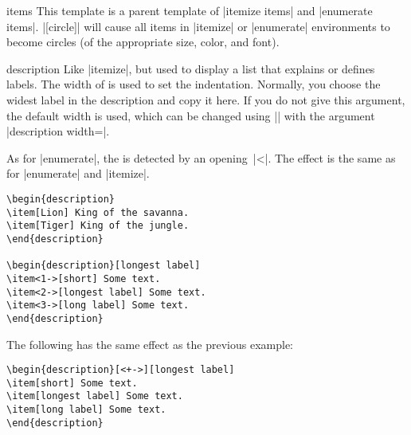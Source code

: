\begin{element}{items}\semiyes\no\no
  This template is a parent template of |itemize items| and
  |enumerate items|.
  \example |[circle]| will cause all items in
  |itemize| or |enumerate| environments to become circles (of the
  appropriate size, color, and font).
\end{element}


\label{section-descriptions}

\begin{environment}{{description}}
  Like |itemize|, but used to display a list that explains or defines
  labels. The width of  is used to set the
  indentation. Normally, you choose the widest label in the
  description and copy it here. If you do not give this argument, the
  default width is used, which can be changed using |\setbeamersize|
  with the argument |description width=|.

  As for |enumerate|, the  is
  detected by an opening~|<|. The effect is the same as for
  |enumerate| and |itemize|.
  \example
\begin{verbatim}
\begin{description}
\item[Lion] King of the savanna.
\item[Tiger] King of the jungle.
\end{description}

\begin{description}[longest label]
\item<1->[short] Some text.
\item<2->[longest label] Some text.
\item<3->[long label] Some text.
\end{description}
\end{verbatim}

  \example The following has the same effect as the previous example:
\begin{verbatim}
\begin{description}[<+->][longest label]
\item[short] Some text.
\item[longest label] Some text.
\item[long label] Some text.
\end{description}
\end{verbatim}


\end{environment}
